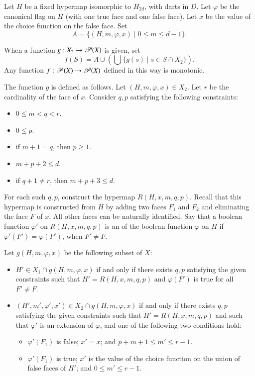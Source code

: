 Let $H$ be a fixed hypermap isomorphic to $H_{2d}$, with darts in $D$.
Let $\varphi$ be the canonical flag on $H$ (with one true face and one
false face).  Let $x$ be the value of the choice function on the false
face.  Set
\begin{displaymath}A = \{(H,m,\varphi,x) \mid 0\le m \le d-1
\}.\end{displaymath}

When a function 
$g:X_2 \to {\mathscr P}(X)$ is given, set 
\begin{displaymath}f(S) = A \cup (\bigcup \{g(s) \mid s\in S\cap
X_2\}).\end{displaymath} Any function $f :{\mathscr P}(X)\to
{\mathscr P}(X)$ defined in this way is monotonic.  %

The function $g$ is defined as follows.  Let $(H,m,\varphi,x)\in X_2$.
Let $r$ be the cardinality of the face of $x$.  Consider $q,p$
satisfying the following constraints:
\begin{itemize}
\item $0\le m < q < r$.
\item $0\le p$.
\item if $m+1 = q$, then $p \ge 1$.
\item $m+p+2 \le d$.
\item if $q+1\ne r$, then $m+p+3\le d$.
\end{itemize}

For each such $q,p$, construct the hypermap $R(H,x,m,q,p)$.  Recall
that this hypermap is constructed from $H$ by adding two faces $F_1$
and $F_2$ and eliminating the face $F$ of $x$.  All other faces can be
naturally identified.  Say that a boolean function $\varphi'$ on
$R(H,x,m,q,p)$ is an  of the boolean function
$\varphi$ on $H$ if $\varphi'(F') =\varphi(F')$, when $F'\ne F$.
%

Let $g(H,m,\varphi,x)$ be the following subset of $X$:
\begin{itemize}
\item $H'\in X_1\cap g(H,m,\varphi,x)$ if and only if there exists
$q,p$ satisfying the given constraints such that $H'=R(H,x,m,q,p)$
and $\varphi(F')$ is true for all $F'\ne F$.
\item $(H',m',\varphi',x')\in X_2\cap g(H,m,\varphi,x)$ if and only if
there exists $q,p$ satisfying the given constraints such that
$H'=R(H,x,m,q,p)$ and such that $\varphi'$ is an extension of
$\varphi$, and one of the following two conditions hold:
\begin{itemize}
\item $\varphi'(F_1)$ is false;  $x' = x$; and  $p+m+1 \le m' \le r-1$.
\item $\varphi'(F_1)$ is true; $x'$ is the value of the choice
function on the union of false faces of $H'$; and $0 \le m' \le
r-1$.
\end{itemize}
\end{itemize}





